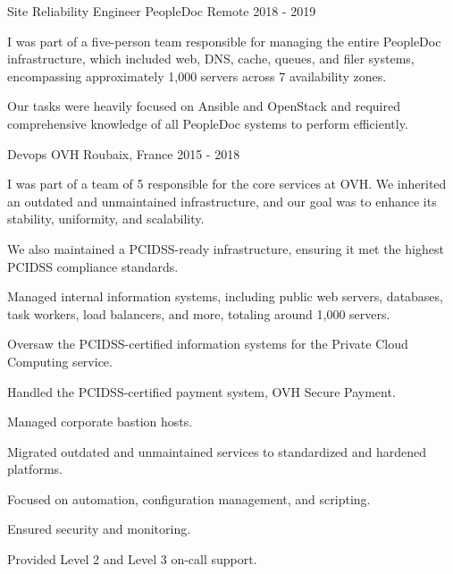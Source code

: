 \begin{cventries}

\cventry
{Site Reliability Engineer} %
{PeopleDoc} %
{Remote} %
{2018 - 2019} %
{ %
\begin{cvitems}
\item {I was part of a five-person team responsible for managing the entire PeopleDoc infrastructure, which included web, DNS, cache, queues, and filer systems, encompassing approximately 1,000 servers across 7 availability zones.}
\item {Our tasks were heavily focused on Ansible and OpenStack and required comprehensive knowledge of all PeopleDoc systems to perform efficiently.}
\end{cvitems}
}


\cventry
{Devops} %
{OVH} %
{Roubaix, France} %
{2015 - 2018} %
{ %
\begin{cvitems}
\item {I was part of a team of 5 responsible for the core services at OVH. We inherited an outdated and unmaintained infrastructure, and our goal was to enhance its stability, uniformity, and scalability.}
\item {We also maintained a PCIDSS-ready infrastructure, ensuring it met the highest PCIDSS compliance standards.}
\item {Managed internal information systems, including public web servers, databases, task workers, load balancers, and more, totaling around 1,000 servers.}
\item {Oversaw the PCIDSS-certified information systems for the Private Cloud Computing service.}
\item {Handled the PCIDSS-certified payment system, OVH Secure Payment.}
\item {Managed corporate bastion hosts.}
\item {Migrated outdated and unmaintained services to standardized and hardened platforms.}
\item {Focused on automation, configuration management, and scripting.}
\item {Ensured security and monitoring.}
\item {Provided Level 2 and Level 3 on-call support.}
\end{cvitems}
}


\end{cventries}
